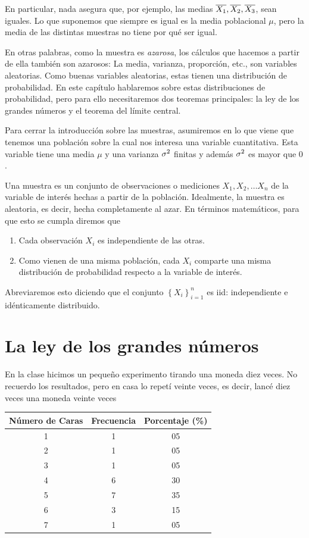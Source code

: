 En particular, nada asegura que, por ejemplo, las medias \(\overline{X_1}, \overline{X_2}, \overline{X_3}\), sean iguales. Lo que suponemos que siempre es igual es la media poblacional \(\mu\), pero la media de las distintas muestras no tiene por qué ser igual.

En otras palabras, como la muestra es \emph{azarosa}, los cálculos que hacemos a partir de ella también son azarosos: La media, varianza, proporción, etc., son variables aleatorias. Como buenas variables aleatorias, estas tienen una distribución de probabilidad. En este capítulo hablaremos sobre estas distribuciones de probabilidad, pero para ello necesitaremos dos teoremas principales: la ley de los grandes números y el teorema del límite central.

\formal
Para cerrar la introducción sobre las muestras, asumiremos en lo que viene que tenemos una población sobre la cual nos interesa una variable cuantitativa. Esta variable tiene una media \(\mu\) y una varianza \(\sigma^2\) finitas y además \(\sigma^2\) es mayor que \(0\).

Una muestra es un conjunto de observaciones o mediciones \(X_1, X_2,\ldots X_n\) de la variable de interés hechas a partir de la población. Idealmente, la muestra es aleatoria, es decir, hecha completamente al azar. En términos matemáticos, para que esto se cumpla diremos que
\begin{enumerate}
\item Cada observación \(X_i\) es independiente de las otras.
\item Como vienen de una misma población, cada \(X_i\) comparte una misma distribución de probabilidad respecto a la variable de interés.
\end{enumerate}
Abreviaremos esto diciendo que el conjunto \(\left\{ X_i \right\}_{i=1}^{n}\) es iid: independiente e idénticamente distribuido.
\informal

\section{La ley de los grandes números}

En la clase hicimos un pequeño experimento tirando una moneda diez veces. No recuerdo los resultados, pero en casa lo repetí veinte veces, es decir, lancé diez veces una moneda veinte veces
\begin{table}[!h]
\centering
\begin{tabular}[t]{SSS}
\toprule
{Número de Caras} & {Frecuencia} & {Porcentaje (\unit{\percent})}\\
 & 1 & 05\\
2 & 1 & 05\\
3 & 1 & 05\\
4 & 6 & 30\\
5 & 7 & 35\\
6 & 3 & 15\\
7 & 1 & 05\\
\bottomrule
\end{tabular}
\end{table}

